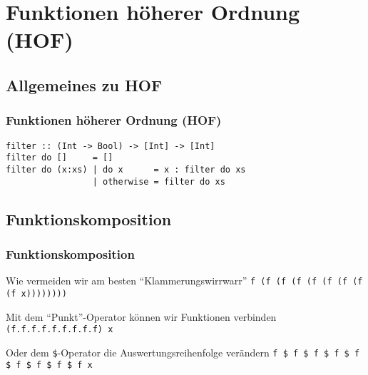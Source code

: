 \section{Funktionen höherer Ordnung (HOF)}
\subsection{Allgemeines zu HOF}

\begin{frame}[fragile]
\frametitle{Funktionen höherer Ordnung (HOF)}
\begin{lstlisting}
filter :: (Int -> Bool) -> [Int] -> [Int]
filter do []     = []
filter do (x:xs) | do x      = x : filter do xs
                 | otherwise = filter do xs
\end{lstlisting}
\end{frame}

\subsection{Funktionskomposition}
\begin{frame}[fragile]
\frametitle{Funktionskomposition}
\begin{block}{Wie vermeiden wir am besten "`Klammerungswirrwarr"'}
\lstinline|f (f (f (f (f (f (f (f (f x))))))))|
\end{block}
\pause
\begin{block}{Mit dem "`Punkt"'-Operator können wir Funktionen verbinden}
\lstinline|(f.f.f.f.f.f.f.f.f) x|
\end{block}
\pause
\begin{block}{Oder dem \lstinline|$|-Operator die Auswertungsreihenfolge verändern}
\lstinline|f $ f $ f $ f $ f $ f $ f $ f $ f x|
\end{block}
\end{frame}

